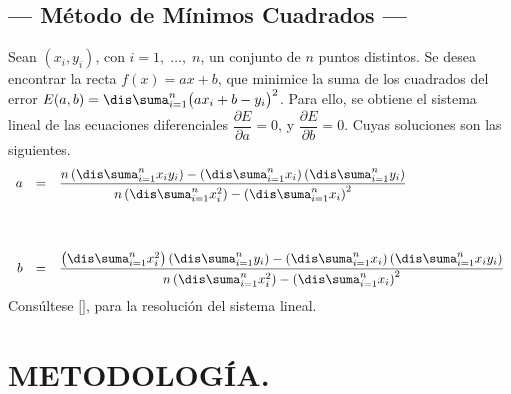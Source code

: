 \documentclass[10pt,a4paper]{article}
\begin{document}
\subsection{--- Método de Mínimos Cuadrados ---} %
Sean \((x_i, y_i)\), con \(i=1, \;\ldots,\; n\), un conjunto de \(n\) puntos distintos. Se desea encontrar la recta \(f(x) =ax+b\), que minimice la suma de los cuadrados del error \(E(a,b) = \dis\suma_{i=1} ^n \big(ax_i+b -y_i\big) ^2\). Para ello, se obtiene el sistema lineal de las ecuaciones diferenciales \(\dfrac{\partial E}{\partial a} =0\), y \(\dfrac{\partial E}{\partial b} =0\). Cuyas soluciones son las siguientes.
\begin{equation}
	\begin{array}{rcl}
		a&=&\dfrac{n\left(\dis\suma_{i=1}^n x_i y_i\right)-\left(\dis\suma_{i=1}^n x_i \right)\left(\dis\suma_{i=1}^n y_i\right) }{n \left(\dis\suma_{i=1}^n x_i^2\right)-\left(\dis\suma_{i=1}^n x_i\right)^2} \\[1.6cm]
		b&=&\dfrac{\left(\dis\suma_{i=1}^n x_i^2\right)\left(\dis\suma_{i=1}^n y_i\right)-\left(\dis\suma_{i=1}^n x_i \right)\left(\dis\suma_{i=1}^n x_i y_i\right) }{n \left(\dis\suma_{i=1}^n x_i^2\right)-\left(\dis\suma_{i=1}^n x_i\right)^2}
	\end{array}
	\label{eq:intercept}
\end{equation}
Consúltese \([\)\cite{mont}\(]\), para la resolución del sistema lineal.


\section{METODOLOGÍA.} %
\end{document}
